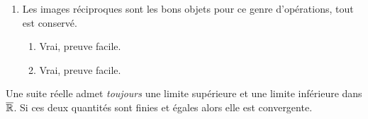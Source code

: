 {\begin{td-sol}[]
\begin{enumerate}
\begin{enumerate}
                    \item Schéma explicatif:
                    \begin{center}
                    \end{center}
                    On voit encore une fois clairement que \(f(\comp A)=f(\varnothing)=\varnothing\). Par contre,
                    \(\comp{f(A)}=\comp B = C\ne\varnothing\).
                \end{enumerate}
                \item Les images réciproques sont les bons objets pour ce genre d'opérations, tout est conservé.
                \begin{enumerate}
                    \item Vrai, preuve facile.
                    \item Vrai, preuve facile.
                \end{enumerate}
            \end{enumerate}

        \end{td-sol}
    }{}
\begin{remark}
    Une suite réelle admet \textit{toujours} une limite supérieure et une limite inférieure dans \(\overline{\mathbb{R}}\). 
    Si ces deux quantités sont finies et égales alors elle est convergente.
\end{remark}
